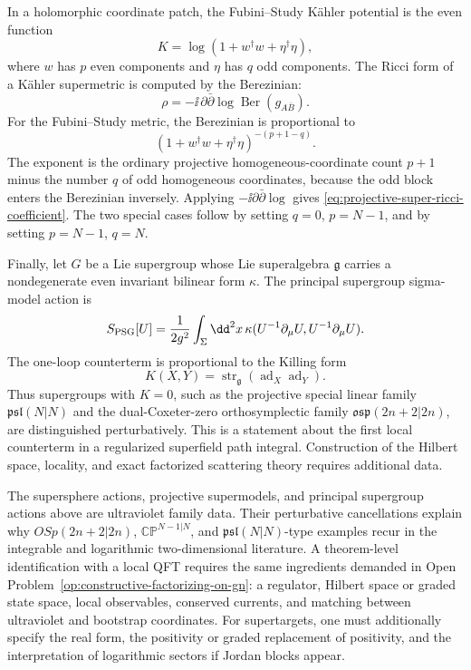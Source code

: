 In a holomorphic coordinate patch, the Fubini--Study Kähler potential is the
even function
\[
  K=\log(1+w^\dagger w+\eta^\dagger\eta),
\]
where \(w\) has \(p\) even components and \(\eta\) has \(q\) odd components.
The Ricci form of a Kähler supermetric is computed by the Berezinian:
\begin{equation}
  \rho=-\ii\,\partial\bar\partial\log\operatorname{Ber}(g_{A\bar B}).
  \label{eq:super-kahler-ricci-berezinian}
\end{equation}
For the Fubini--Study metric, the Berezinian is proportional to
\[
  (1+w^\dagger w+\eta^\dagger\eta)^{-(p+1-q)}.
\]
The exponent is the ordinary projective homogeneous-coordinate count
\(p+1\) minus the number \(q\) of odd homogeneous coordinates, because the
odd block enters the Berezinian inversely.  Applying
\(-\ii\partial\bar\partial\log\) gives
\eqref{eq:projective-super-ricci-coefficient}.  The two special cases follow
by setting \(q=0\), \(p=N-1\), and by setting \(p=N-1\), \(q=N\).

Finally, let \(G\) be a Lie supergroup whose Lie superalgebra
\(\mathfrak g\) carries a nondegenerate even invariant bilinear form
\(\kappa\).  The principal supergroup sigma-model action is
\begin{equation}
  S_{\rm PSG}[U]
  =
  \frac1{2g^2}\int_\Sigma\dd^2x\,
  \kappa(U^{-1}\partial_\mu U,U^{-1}\partial_\mu U).
  \label{eq:principal-supergroup-action}
\end{equation}
The one-loop counterterm is proportional to the Killing form
\begin{equation}
  K(X,Y)=\operatorname{str}_{\mathfrak g}
  (\operatorname{ad}_X\operatorname{ad}_Y).
  \label{eq:supergroup-killing-form}
\end{equation}
Thus supergroups with \(K=0\), such as the projective special linear family
\(\mathfrak{psl}(N|N)\) and the dual-Coxeter-zero orthosymplectic family
\(\mathfrak{osp}(2n+2|2n)\), are distinguished perturbatively.  This is a
statement about the first local counterterm in a regularized superfield
path integral.  Construction of the Hilbert space, locality, and exact
factorized scattering theory requires additional data.

\begin{remark}
\label{ca:supercoset-status}
The supersphere actions, projective supermodels, and principal supergroup
actions above are ultraviolet family data.  Their perturbative cancellations
explain why \(OSp(2n+2|2n)\), \(\mathbb{CP}^{N-1|N}\), and
\(\mathfrak{psl}(N|N)\)-type examples recur in the integrable and logarithmic
two-dimensional literature.  A theorem-level identification with a local QFT
requires the same ingredients demanded in
Open Problem~\ref{op:constructive-factorizing-on-gn}: a regulator, Hilbert
space or graded state space, local observables, conserved currents, and
matching between ultraviolet and bootstrap coordinates.  For supertargets,
one must additionally specify the real form, the positivity or graded
replacement of positivity, and the interpretation of logarithmic sectors if
Jordan blocks appear.
\end{remark}


